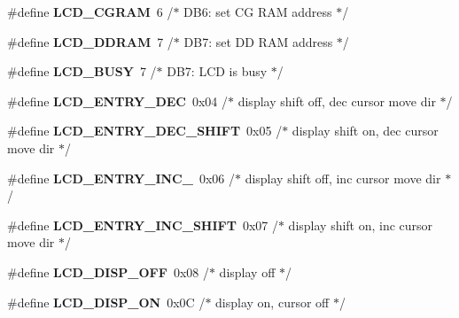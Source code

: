 \begin{DoxyCompactItemize}
\item 
\#define {\bfseries L\+C\+D\+\_\+\+C\+G\+R\+AM}~6 /$\ast$ D\+B6\+: set CG R\+AM address             $\ast$/\hypertarget{a00010_ga3b38de74c362be1781fef1136aa9684c}{}\label{a00010_ga3b38de74c362be1781fef1136aa9684c}

\item 
\#define {\bfseries L\+C\+D\+\_\+\+D\+D\+R\+AM}~7 /$\ast$ D\+B7\+: set DD R\+AM address             $\ast$/\hypertarget{a00010_gae54acf3ccc45b7d6be334a03627740c6}{}\label{a00010_gae54acf3ccc45b7d6be334a03627740c6}

\item 
\#define {\bfseries L\+C\+D\+\_\+\+B\+U\+SY}~7 /$\ast$ D\+B7\+: L\+CD is busy                    $\ast$/\hypertarget{a00010_gac8dd1658e235f174d1cabae5c438943d}{}\label{a00010_gac8dd1658e235f174d1cabae5c438943d}

\item 
\#define {\bfseries L\+C\+D\+\_\+\+E\+N\+T\+R\+Y\+\_\+\+D\+EC}~0x04 /$\ast$ display shift off, dec cursor move dir $\ast$/\hypertarget{a00010_gaad56f8e07634e85663f56888ae97089c}{}\label{a00010_gaad56f8e07634e85663f56888ae97089c}

\item 
\#define {\bfseries L\+C\+D\+\_\+\+E\+N\+T\+R\+Y\+\_\+\+D\+E\+C\+\_\+\+S\+H\+I\+FT}~0x05 /$\ast$ display shift on,  dec cursor move dir $\ast$/\hypertarget{a00010_ga1c62932f252c6262cbef728add9696e4}{}\label{a00010_ga1c62932f252c6262cbef728add9696e4}

\item 
\#define {\bfseries L\+C\+D\+\_\+\+E\+N\+T\+R\+Y\+\_\+\+I\+N\+C\+\_\+}~0x06 /$\ast$ display shift off, inc cursor move dir $\ast$/\hypertarget{a00010_gad27ddc4b8d03594662c8757f946dde28}{}\label{a00010_gad27ddc4b8d03594662c8757f946dde28}

\item 
\#define {\bfseries L\+C\+D\+\_\+\+E\+N\+T\+R\+Y\+\_\+\+I\+N\+C\+\_\+\+S\+H\+I\+FT}~0x07 /$\ast$ display shift on,  inc cursor move dir $\ast$/\hypertarget{a00010_gafabd0215cc6ae5539dc638dbec44a506}{}\label{a00010_gafabd0215cc6ae5539dc638dbec44a506}

\item 
\#define {\bfseries L\+C\+D\+\_\+\+D\+I\+S\+P\+\_\+\+O\+FF}~0x08 /$\ast$ display off                            $\ast$/\hypertarget{a00010_gaa2966175115943883f51e9c90478540c}{}\label{a00010_gaa2966175115943883f51e9c90478540c}

\item 
\#define {\bfseries L\+C\+D\+\_\+\+D\+I\+S\+P\+\_\+\+ON}~0x0\+C /$\ast$ display on, cursor off                 $\ast$/\hypertarget{a00010_ga5163a96b133868975c0738e180b30cb8}{}\label{a00010_ga5163a96b133868975c0738e180b30cb8}


\end{DoxyCompactItemize}
